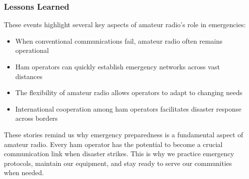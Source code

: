 \subsubsection*{Lessons Learned}
These events highlight several key aspects of amateur radio's role in emergencies:
\begin{itemize}
    \item When conventional communications fail, amateur radio often remains operational
    \item Ham operators can quickly establish emergency networks across vast distances
    \item The flexibility of amateur radio allows operators to adapt to changing needs
    \item International cooperation among ham operators facilitates disaster response across borders
\end{itemize}

These stories remind us why emergency preparedness is a fundamental aspect of amateur radio. Every ham operator has the potential to become a crucial communication link when disaster strikes. This is why we practice emergency protocols, maintain our equipment, and stay ready to serve our communities when needed.
